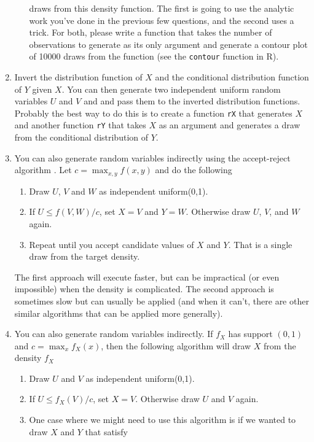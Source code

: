 \begin{enumerate}
\begin{enumerate}
    draws from this density function. The first is going to use the
    analytic work you've done in the previous few questions, and the
    second uses a trick. For both, please write a function that takes
    the number of observations to generate as its only argument and
    generate a contour plot of 10000 draws from the function (see the
    \texttt{contour} function in R).
  \end{enumerate}
\item Invert the distribution function of $X$ and the conditional
  distribution function of $Y$ given $X$. You can then generate two
  independent uniform random variables $U$ and $V$ and and pass them
  to the inverted distribution functions. Probably the best way to do
  this is to create a function \texttt{rX} that generates $X$ and
  another function \texttt{rY} that takes $X$ as an argument and
  generates a draw from the conditional distribution of $Y$.
\item You can also generate random variables indirectly using the
  accept-reject algorithm \citep[Section 5.6.2]{CaB_2001}. Let $c =
  \max_{x,y} f(x,y)$ and do the following
  \begin{enumerate}
  \item Draw $U$, $V$ and $W$ as independent uniform(0,1).
  \item If $U ≤ f(V,W) / c$, set $X=V$ and $Y=W$.  Otherwise draw $U$,
    $V$, and $W$ again.
  \item Repeat until you accept candidate values of $X$ and $Y$. That
    is a single draw from the target density.
  \end{enumerate}
  The first approach will execute faster, but can be impractical (or
  even impossible) when the density is complicated. The second
  approach is sometimes slow but can usually be applied (and when it
  can't, there are other similar algorithms that can be applied more
  generally).
\item You can also generate random variables indirectly.  If $f_X$ has
  support $(0,1)$ and $c = \max_x f_X(x)$, then the following
  algorithm will draw $X$ from the density $f_X$ \citep[see][Section
  5.6.2]{CaB_2001}
  \begin{enumerate}
  \item Draw $U$ and $V$ as independent uniform(0,1).
  \item If $U ≤ f_X(V) / c$, set $X = V$.  Otherwise draw $U$ and $V$
    again.
  \item One case where we might need to use this algorithm is if we
    wanted to draw $X$ and $Y$ that satisfy

\end{enumerate}
\end{enumerate}
